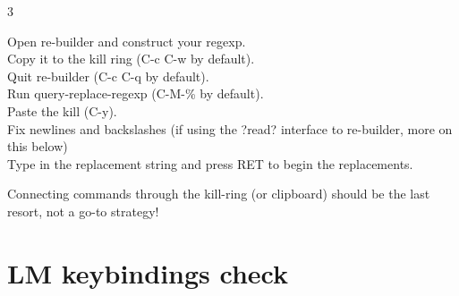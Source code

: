 \documentclass[11pt,landscape,a4paper]{article}
\begin{document}
\begin{multicols}{3}
\vspace*{1em}

Open re-builder and construct your regexp.\\
Copy it to the kill ring (C-c C-w by default).\\
Quit re-builder (C-c C-q by default).\\
Run query-replace-regexp (C-M-\% by default).\\
Paste the kill (C-y).\\
Fix newlines and backslashes (if using the ?read? interface to re-builder, more on this below)\\
Type in the replacement string and press RET to begin the replacements.

\vspace*{1em}

Connecting commands through the kill-ring (or clipboard) should be the last resort, not a go-to strategy!


\vfill\null
\columnbreak

\section{LM keybindings check}


\end{multicols}
\end{document}
